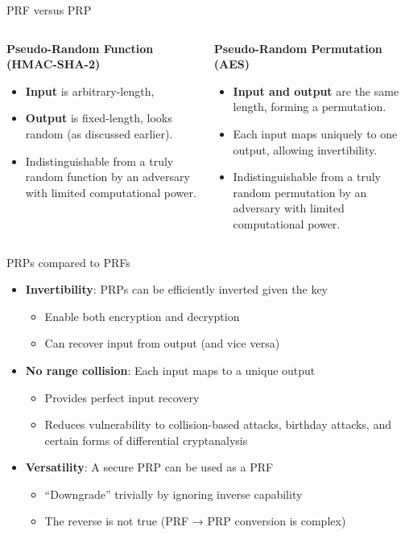 \documentclass[aspectratio=169, lualatex, handout]{beamer}
\begin{document}
\begin{frame}{PRF versus PRP}
	\begin{columns}[c]
		\begin{column}{0.5\textwidth}
			\textbf{Pseudo-Random Function (HMAC-SHA-2)}
			\begin{itemize}
				\item \textbf{Input} is arbitrary-length,
				\item \textbf{Output} is fixed-length, looks random (as discussed
				      earlier).
				\item Indistinguishable from a truly random function by an adversary with
				      limited computational power.
			\end{itemize}
		\end{column}

		\begin{column}{0.5\textwidth}
			\textbf{Pseudo-Random Permutation (AES)}
			\begin{itemize}
				\item \textbf{Input and output} are the same length, forming a permutation.
				\item Each input maps uniquely to one output, allowing invertibility.
				\item Indistinguishable from a truly random permutation by an adversary
				      with limited computational power.
			\end{itemize}
		\end{column}
	\end{columns}
\end{frame}

\begin{frame}{PRPs compared to PRFs}
	\begin{itemize}
		\item \textbf{Invertibility}: PRPs can be efficiently inverted given the key
		      \begin{itemize}
			      \item Enable both encryption and decryption
			      \item Can recover input from output (and vice versa)
		      \end{itemize}
		\item \textbf{No range collision}: Each input maps to a unique output
		      \begin{itemize}
			      \item Provides perfect input recovery
			      \item Reduces vulnerability to collision-based attacks, birthday attacks, and certain forms of differential cryptanalysis
		      \end{itemize}
		\item \textbf{Versatility}: A secure PRP can be used as a PRF
		      \begin{itemize}
			      \item ``Downgrade'' trivially by ignoring inverse capability
			      \item The reverse is not true (PRF → PRP conversion is complex)
		      \end{itemize}
	\end{itemize}
\end{frame}
\end{document}
